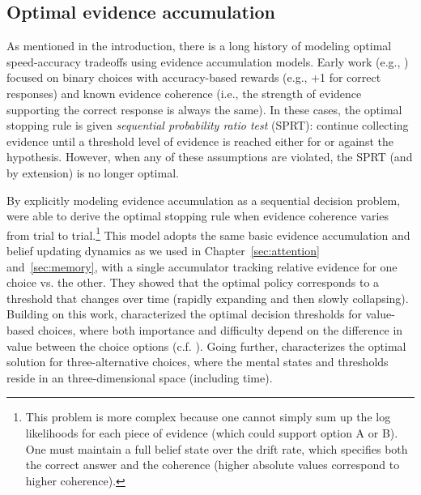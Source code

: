 \subsection{Optimal evidence accumulation}

As mentioned in the introduction, there is a long history of modeling optimal speed-accuracy tradeoffs using evidence accumulation models. Early work (e.g., \citealp{bogacz2006physics,vul2009one}) focused on binary choices with accuracy-based rewards (e.g., +1 for correct responses) and known evidence coherence (i.e., the strength of evidence supporting the correct response is always the same). In these cases, the optimal stopping rule is given \emph{sequential probability ratio test} (SPRT): continue collecting evidence until a threshold level of evidence is reached either for or against the hypothesis. However, when any of these assumptions are violated, the SPRT (and by extension) is no longer optimal.

By explicitly modeling evidence accumulation as a sequential decision problem, \citet{drugowitsch2012cost} were able to derive the optimal stopping rule when evidence coherence varies from trial to trial.\footnote{%
  This problem is more complex because one cannot simply sum up the log likelihoods for each piece of evidence (which could support option A or B). One must maintain a full belief state over the drift rate, which specifies both the correct answer and the coherence (higher absolute values correspond to higher coherence). 
} This model adopts the same basic evidence accumulation and belief updating dynamics as we used in Chapter~\ref{sec:attention} and~\ref{sec:memory}, with a single accumulator tracking relative evidence for one choice vs. the other. They showed that the optimal policy corresponds to a threshold that changes over time (rapidly expanding and then slowly collapsing). Building on this work, \citet{tajima2016optimal} characterized the optimal decision thresholds for value-based choices, where both importance and difficulty depend on the difference in value between the choice options (c.f. \citealp{fudenberg2018speed}). Going further, \citet{tajima2019optimal} characterizes the optimal solution for three-alternative choices, where the mental states and thresholds reside in an three-dimensional space (including time).


